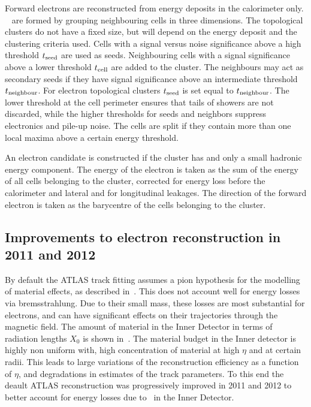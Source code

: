 Forward electrons are reconstructed from energy deposits in the calorimeter
only. ~\cite{Lampl:1099735} are formed by grouping neighbouring cells in three
dimensions. The topological clusters do not have a fixed size, but will depend
on the energy deposit and the clustering criteria used. Cells with a
signal versus noise significance above a high threshold $t_{\rm{seed}}$ are used as seeds.
Neighbouring cells with a signal significance above a lower threshold
$t_{\rm{cell}}$ are added to the cluster. The neighbours may act as
secondary seeds if they have signal significance above an intermediate threshold
$t_{\rm{neighbour}}$. For electron topological clusters $t_{\rm{seed}}$ is set
equal to $t_{\rm{neighbour}}$. The lower threshold at the cell perimeter ensures that
tails of showers are not discarded, while the higher thresholds for seeds and
neighbors suppress electronics and pile-up noise. The cells are split if they
contain more than one local maxima above a certain energy threshold. 

An electron candidate is constructed if the cluster has  and only a
small hadronic energy component. The energy
of the electron is taken as the sum of the energy of all cells belonging to the cluster,
corrected for energy loss before the calorimeter and lateral and for longitudinal
leakages. The direction of the forward electron is taken as the barycentre of the cells
belonging to the cluster.

\subsection{Improvements to electron reconstruction in 2011 and 2012}

By default the ATLAS track fitting assumes a pion hypothesis for the modelling
of material effects, as described in~. This does not account well for energy losses via
bremsstrahlung. Due to their small mass, these losses are most substantial for
electrons, and can have significant effects on their trajectories through the magnetic
field. The amount of material in the Inner Detector in terms of radiation lengths
$X_{0}$ is shown in~. The material budget in the Inner detector
is highly non uniform with, high concentration of material at high $\eta$ and at certain radii.
This leads to large variations of the reconstruction efficiency as a function of
$\eta$, and degradations in estimates of the track parameters. To this end the
deault ATLAS reconstruction was progressively improved in 2011 and 2012 to
better account for energy losses due to \brem\ in the Inner Detector.

